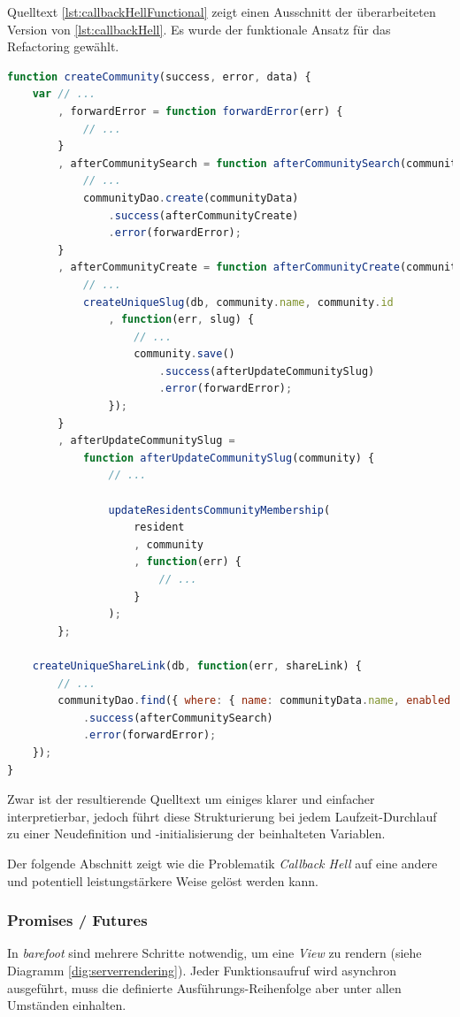 Quelltext \ref{lst:callbackHellFunctional} zeigt einen Ausschnitt der überarbeiteten Version von \ref{lst:callbackHell}. Es wurde der funktionale Ansatz für das Refactoring gewählt.

\begin{lstlisting}[language=JavaScript, firstnumber=192, caption={Ausschnitt aus dem neusten Community Controller \cite{masterCommunityController}}, label={lst:callbackHellFunctional}]
function createCommunity(success, error, data) {
	var // ...
		, forwardError = function forwardError(err) {
			// ...
		}
		, afterCommunitySearch = function afterCommunitySearch(community) {
			// ...
			communityDao.create(communityData)
				.success(afterCommunityCreate)
				.error(forwardError);
		}
		, afterCommunityCreate = function afterCommunityCreate(community) {
			// ...
			createUniqueSlug(db, community.name, community.id
				, function(err, slug) {
					// ...
					community.save()
						.success(afterUpdateCommunitySlug)
						.error(forwardError);
				});
		}
		, afterUpdateCommunitySlug =
			function afterUpdateCommunitySlug(community) {
				// ...

				updateResidentsCommunityMembership(
					resident
					, community
					, function(err) {
						// ...
					}
				);
		};

	createUniqueShareLink(db, function(err, shareLink) {
		// ...
		communityDao.find({ where: { name: communityData.name, enabled: true }})
			.success(afterCommunitySearch)
			.error(forwardError);
	});
}
\end{lstlisting}

Zwar ist der resultierende Quelltext um einiges klarer und einfacher interpretierbar, jedoch führt diese Strukturierung bei jedem Laufzeit-Durchlauf zu einer Neudefinition und -initialisierung der beinhalteten Variablen.

Der folgende Abschnitt zeigt wie die Problematik \emph{Callback Hell} auf eine andere und potentiell leistungstärkere Weise gelöst werden kann.


\subsubsection*{Promises / Futures}

In \emph{barefoot} sind mehrere Schritte notwendig, um eine \emph{View} zu rendern (siehe Diagramm \ref{dig:serverrendering}).
Jeder Funktionsaufruf wird asynchron ausgeführt, muss die definierte Ausführungs-Reihenfolge aber unter allen Umständen einhalten.

